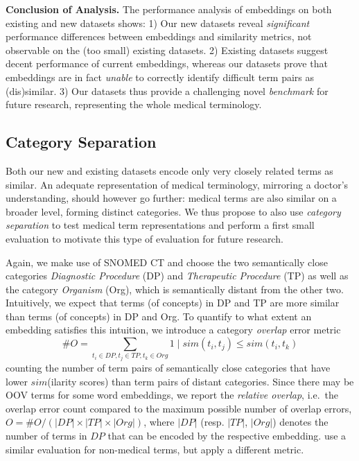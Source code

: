\documentclass[letterpaper]{article} %
\begin{document}
\noindent\textbf{Conclusion of Analysis.}
The performance analysis of embeddings on both existing and new datasets shows:
1) Our new datasets reveal \emph{significant} performance differences between embeddings and similarity metrics, not observable on the (too small) existing datasets.
2) Existing datasets suggest decent performance of current embeddings, whereas our datasets prove that embeddings are in fact \emph{unable} to correctly identify difficult term pairs as (dis)similar.
3) Our datasets thus provide a challenging novel \emph{benchmark} for future research, representing the whole medical terminology.


\subsection{Category Separation}
Both our new and existing datasets encode only very closely related terms as similar.
An adequate representation of medical terminology, mirroring a doctor's understanding, should however go further: medical terms are also similar on a broader level, forming distinct categories.
We thus propose to also use \emph{category separation} to test medical term representations and perform a first small evaluation to motivate this type of evaluation for future research.

Again, we make use of SNOMED CT and choose the two semantically close categories
\emph{Diagnostic Procedure} (DP) and \emph{Therapeutic Procedure} (TP) as well as the category \emph{Organism} (Org), which is semantically distant from the other two.
Intuitively, we expect that terms (of concepts) in DP and TP are more similar than terms (of concepts) in DP and Org.
To quantify to what extent an embedding satisfies this intuition, we introduce a category \emph{overlap} error metric
\[\#O = \sum_{t_i \in DP, t_j \in TP, t_k \in Org} 1 \mid sim(t_i, t_j) \leq sim(t_i,t_k)\]
counting the number of term pairs of semantically close categories that have lower $sim$(ilarity scores) than term pairs of distant categories.
Since there may be OOV terms for some word embeddings, we report the \emph{relative overlap}, i.e.~the overlap error count compared to the maximum possible number of overlap errors,
$O = \#O  / (|DP| \times |TP| \times |Org|)$, where $|DP|$ (resp. $|TP|$, $|Org|$) denotes the number of terms in $DP$ that can be encoded by the respective embedding.
\citeauthor{DBLP:journals/corr/abs-1803-04488}  use
a similar evaluation for non-medical terms, but apply a different metric.
\end{document}
